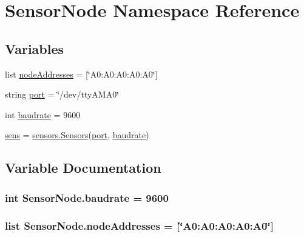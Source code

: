 \hypertarget{namespaceSensorNode}{}\section{Sensor\+Node Namespace Reference}
\label{namespaceSensorNode}
\subsection*{Variables}
\begin{DoxyCompactItemize}
\item 
list \hyperlink{namespaceSensorNode_ac1e752b62092c1c9e27da570c73c0ce7}{node\+Addresses} = \mbox{[}\char`\"{}A0\+:\+A0\+:\+A0\+:\+A0\+:\+A0\char`\"{}\mbox{]}
\item 
string \hyperlink{namespaceSensorNode_a1a9ff3aa5a94fc55ff0fa24862db071b}{port} = \char`\"{}/dev/tty\+A\+M\+A0\char`\"{}
\item 
int \hyperlink{namespaceSensorNode_a50365066340e665ac5f274dfb3a7ae82}{baudrate} = 9600
\item 
\hyperlink{namespaceSensorNode_a341717027383e08a67cc397e2d00a99e}{sens} = \hyperlink{classsensors_1_1Sensors}{sensors.\+Sensors}(\hyperlink{namespaceSensorNode_a1a9ff3aa5a94fc55ff0fa24862db071b}{port}, \hyperlink{namespaceSensorNode_a50365066340e665ac5f274dfb3a7ae82}{baudrate})
\end{DoxyCompactItemize}


\subsection{Variable Documentation}
\subsubsection[{\texorpdfstring{baudrate}{baudrate}}]{\setlength{\rightskip}{0pt plus 5cm}int Sensor\+Node.\+baudrate = 9600}\hypertarget{namespaceSensorNode_a50365066340e665ac5f274dfb3a7ae82}{}\label{namespaceSensorNode_a50365066340e665ac5f274dfb3a7ae82}
\subsubsection[{\texorpdfstring{node\+Addresses}{nodeAddresses}}]{\setlength{\rightskip}{0pt plus 5cm}list Sensor\+Node.\+node\+Addresses = \mbox{[}\char`\"{}A0\+:\+A0\+:\+A0\+:\+A0\+:\+A0\char`\"{}\mbox{]}}\hypertarget{namespaceSensorNode_ac1e752b62092c1c9e27da570c73c0ce7}{}\label{namespaceSensorNode_ac1e752b62092c1c9e27da570c73c0ce7}
